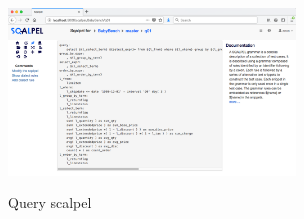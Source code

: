 \documentclass{cidr-2019}
\begin{document}








\begin{figure}[t!]
\centering
\includegraphics[height=2in,width=3in]{Figures/scalpel2.png}
\caption{Query scalpel
	\label{fig:scalpel}}
\end{figure}


\end{document}
